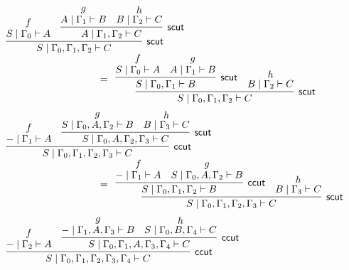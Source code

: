 \documentclass[sn-mathphys-num]{sn-jnl}%
\newcommand{\GG}{\Gamma}
\newcommand{\vd}{\vdash}
\newcommand{\mf}[1]{\mathsf{#1}}
\theoremstyle{thmstyleone}%
\theoremstyle{thmstyletwo}%
\theoremstyle{thmstylethree}%
\begin{document}
\begin{figure}
  \begin{displaymath}
    \begin{array}{l}
      \begin{array}{c}
        \infer[\mf{scut}]{S \mid \GG_0 , \GG_1 , \GG_2 \vd C}{
        \deduce{S \mid \GG_0 \vd A}{f}
        &
        \infer[\mf{scut}]{A \mid \GG_1 , \GG_2 \vd C}{
        \deduce{A \mid \GG_1 \vd B}{g}
        &
        \deduce{B \mid \GG_2 \vd C}{h}
        }
        }
      \end{array}
      \\[10pt]
      \qquad \qquad \qquad \qquad \qquad  =
      \begin{array}{c}
        \infer[\mf{scut}]{S \mid \GG_0 , \GG_1 , \GG_2 \vd C}{
        \infer[\mf{scut}]{S \mid \GG_0 , \GG_1 \vd B}{
        \deduce{S \mid \GG_0 \vd A}{f}
        &
        \deduce{A \mid \GG_1 \vd B}{g}
        }
        &
        \deduce{B \mid \GG_2 \vd C}{h}
        }
      \end{array}
      \\[26pt]
      \begin{array}{c}
        \infer[\mf{ccut}]{S \mid \GG_0 , \GG_1 , \GG_2 , \GG_3 \vd C}{
        \deduce{{-} \mid \GG_1 \vd A}{f}
        &
        \infer[\mf{scut}]{S \mid \GG_0 , A , \GG_2 , \GG_3 \vd C}{
        \deduce{S \mid \GG_0 , A , \GG_2 \vd B}{g}
        &
        \deduce{B \mid \GG_3 \vd C}{h}
        }
        }
      \end{array}
      \\[10pt]
      \qquad \qquad \qquad \qquad \qquad  =
      \begin{array}{c}
        \infer[\mf{scut}]{S \mid \GG_0 , \GG_1 , \GG_2 , \GG_3 \vd C}{
        \infer[\mf{ccut}]{S \mid \GG_0 , \GG_1 , \GG_2 \vd B}{
        \deduce{{-} \mid \GG_1 \vd A}{f}
        &
        \deduce{S \mid \GG_0 , A , \GG_2 \vd B}{g}
        }
        &
        \deduce{B \mid \GG_3 \vd C}{h}
        }
      \end{array}
      \\[26pt]
      \begin{array}{c}
        \infer[\mf{ccut}]{S \mid \GG_0 , \GG_1 , \GG_2 , \GG_3 , \GG_4 \vd C}{
        \deduce{{-} \mid \GG_2 \vd A}{f}
        &
        \infer[\mf{ccut}]{S \mid \GG_0 , \GG_1 , A , \GG_3 , \GG_4 \vd C}{
        \deduce{{-} \mid \GG_1 , A , \GG_3 \vd B}{g}
        &
        \deduce{S \mid \GG_0 , B , \GG_4 \vd C}{h}
        }
        }

\end{array}
\end{array}
\end{displaymath}
\end{figure}
\end{document}
